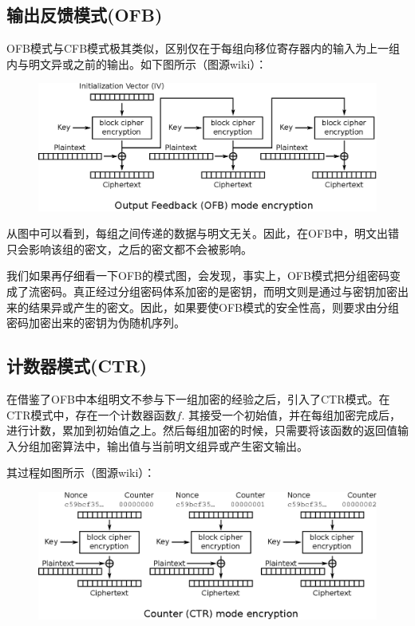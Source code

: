 \subsection{输出反馈模式(OFB)}
OFB模式与CFB模式极其类似，区别仅在于每组向移位寄存器内的输入为上一组内与明文异或之前的输出。如下图所示（图源wiki）：
\begin{figure}[H]
\centering
\includegraphics[scale=1]{chapters/chapter_4/OFB.eps}
\end{figure}

从图中可以看到，每组之间传递的数据与明文无关。因此，在OFB中，明文出错只会影响该组的密文，之后的密文都不会被影响。\par
我们如果再仔细看一下OFB的模式图，会发现，事实上，OFB模式把分组密码变成了流密码。真正经过分组密码体系加密的是密钥，而明文则是通过与密钥加密出来的结果异或产生的密文。因此，如果要使OFB模式的安全性高，则要求由分组密码加密出来的密钥为伪随机序列。
\subsection{计数器模式(CTR)}
在借鉴了OFB中本组明文不参与下一组加密的经验之后，引入了CTR模式。在CTR模式中，存在一个计数器函数$f$. 其接受一个初始值，并在每组加密完成后，进行计数，累加到初始值之上。然后每组加密的时候，只需要将该函数的返回值输入分组加密算法中，输出值与当前明文组异或产生密文输出。\par
其过程如图所示（图源wiki）：
\begin{figure}[H]
\centering
\includegraphics[scale=1]{chapters/chapter_4/CTR.eps}
\end{figure}

